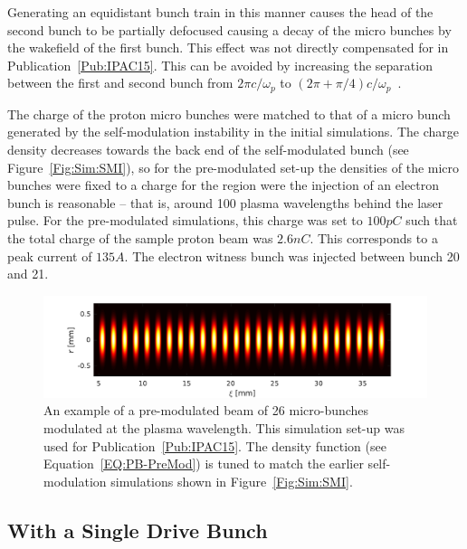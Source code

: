 Generating an equidistant bunch train in this manner causes the head of the second bunch to be partially defocused causing a decay of the micro bunches by the wakefield of the first bunch.
This effect was not directly compensated for in Publication~\ref{Pub:IPAC15}.
This can be avoided by increasing the separation between the first and second bunch from $2\pi c/\omega_p$ to $(2\pi+\pi/4) c/\omega_p$~\cite{lotov:2018}.

The charge of the proton micro bunches were matched to that of a micro bunch generated by the self-modulation instability in the initial simulations.
The charge density decreases towards the back end of the self-modulated bunch (see Figure~\ref{Fig:Sim:SMI}), so for the pre-modulated set-up the densities of the micro bunches were fixed to a charge for the region were the injection of an electron bunch is reasonable -- that is, around 100 plasma wavelengths behind the laser pulse.
For the pre-modulated simulations, this charge was set to $100\unit{pC}$ such that the total charge of the sample proton beam was $2.6\unit{nC}$.
This corresponds to a peak current of $135\unit{A}$.
The electron witness bunch was injected between bunch 20 and 21.

\begin{figure}[hbt]
    \centering
    \includegraphics[width=0.9375\linewidth,trim={0mm 0mm 0mm 0mm},clip]{figures/PBPreMod}
    \caption{\label{Fig:PBPreMod}
        An example of a pre-modulated beam of 26 micro-bunches modulated at the plasma wavelength.
        This simulation set-up was used for Publication~\ref{Pub:IPAC15}.
        The density function (see Equation~\ref{EQ:PB-PreMod}) is tuned to match the earlier self-modulation simulations shown in Figure~\ref{Fig:Sim:SMI}.
    }
\end{figure}


\subsection{With a Single Drive Bunch}
\label{Sim:PBSingle}

